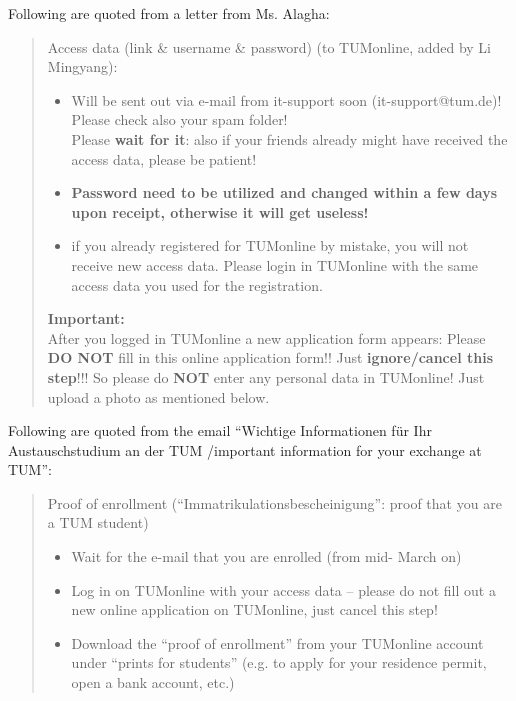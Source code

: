 \documentclass[oneside,final]{book}
\begin{document}
Following are quoted from a letter from Ms. Alagha:
\begin{quotation}
Access data (link \& username \& password) {\color{gray}(to TUMonline, added by Li Mingyang)}:
\begin{itemize}
\renewcommand\labelitemi{--}  %
\item Will be sent out via e-mail from it-support soon (it-support@tum.de)!
Please check also your spam folder!\\
Please \textbf{wait for it}: also if your friends already might have received the access data, please be patient!
\item \textbf{Password need to be {\color{blue}utilized and changed within a few days upon receipt}, otherwise it will get useless!}
\item if you already registered for TUMonline by mistake, you will not receive new access data. Please login in TUMonline with the same access data you used for the registration.
\end{itemize}
 
\textbf{Important:}\\
After you logged in TUMonline a new application form appears: Please \textbf{DO NOT} fill in this online application form!! Just \textbf{\color{blue}ignore/cancel this step}!!! So please do \textbf{NOT} enter any personal data in TUMonline! Just upload a photo as mentioned below.
\end{quotation}

Following are quoted from the email ``Wichtige Informationen für Ihr Austauschstudium an der TUM /important information for your exchange at TUM'':
\begin{quotation}
  Proof of enrollment (“Immatrikulationsbescheinigung”: proof that you are a TUM student)
  \begin{itemize}
  \item Wait for the e-mail that you are enrolled (from mid- March on)
  \item Log in on TUMonline with your access data -- please do not fill out a new online application on TUMonline, just cancel this step!
  \item Download the “proof of enrollment” from your TUMonline account under “prints for students” (e.g. to apply for your residence permit, open a bank account, etc.)
  \end{itemize}
\end{quotation}
\end{document}
